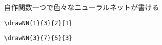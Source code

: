 \documentclass[./main]{subfiles}
\begin{document}
\begin{frame}
  \framebreak
  \centering
  自作関数一つで色々なニューラルネットが書ける\\


  
  \begin{minipage}[b]{0.35\linewidth}
    \centering
    \verb|\drawNN{1}{3}{2}{1}|
  \end{minipage}
  \hfill
  \begin{minipage}[b]{0.6\linewidth}
    \centering
    \verb|\drawNN{3}{7}{5}{3}|
  \end{minipage}
  
\end{frame}




\ifSubfilesClassLoaded{%
  \begin{frame}
    
  \end{frame}
}{}
\end{document}
